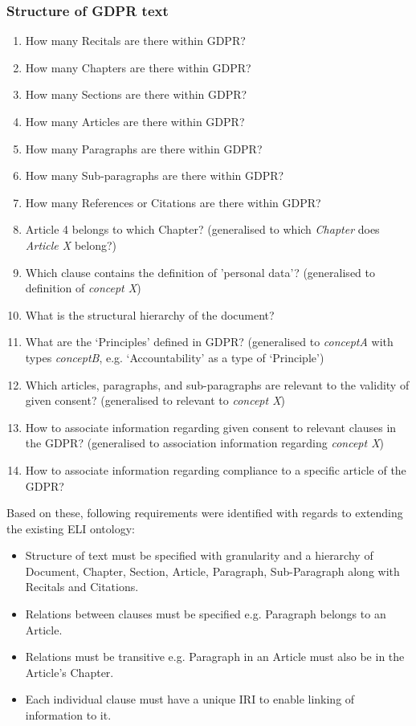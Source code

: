 \subsubsection{Structure of GDPR text}
\begin{enumerate}[label={\texttt{CQ.\theenumi}}]
    \item How many Recitals are there within GDPR?
    \item How many Chapters are there within GDPR?
    \item How many Sections are there within GDPR?
    \item How many Articles are there within GDPR?
    \item How many Paragraphs are there within GDPR?
    \item How many Sub-paragraphs are there within GDPR?
    \item How many References or Citations are there within GDPR?
    \item Article 4 belongs to which Chapter? (generalised to which \textit{Chapter} does \textit{Article X} belong?)
    \item Which clause contains the definition of 'personal data'? (generalised to definition of \textit{concept X})
    \item What is the structural hierarchy of the document?
    \item What are the `Principles' defined in GDPR? (generalised to \textit{conceptA} with types \textit{conceptB}, e.g. `Accountability' as a type of `Principle')
    \item Which articles, paragraphs, and sub-paragraphs are relevant to the validity of given consent? (generalised to relevant to \textit{concept X})
    \item How to associate information regarding given consent to relevant clauses in the GDPR? (generalised to association information regarding \textit{concept X})
    \item How to associate information regarding compliance to a specific article of the GDPR?
\end{enumerate}

Based on these, following requirements were identified with regards to extending the existing ELI ontology:
\begin{itemize}
    \item Structure of text must be specified with granularity and a hierarchy of Document, Chapter, Section, Article, Paragraph, Sub-Paragraph along with Recitals and Citations.
    \item Relations between clauses must be specified e.g. Paragraph belongs to an Article.
    \item Relations must be transitive e.g. Paragraph in an Article must also be in the Article's Chapter.
    \item Each individual clause must have a unique IRI to enable linking of information to it.
\end{itemize}

